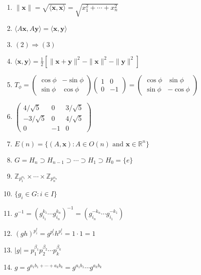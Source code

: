 \documentclass[oneside,10pt,]{article}
\begin{document}
\begin{enumerate}
\item{}\(\displaystyle \| {\mathbf x} \| = \sqrt{\langle {\mathbf x}, {\mathbf x} \rangle} = \sqrt{x_1^2 + \cdots + x_n^2}\)%
\item{}\(\displaystyle \langle A{\mathbf x}, A{\mathbf y} \rangle = \langle {\mathbf x},{\mathbf y} \rangle\)%
\item{}\(\displaystyle (2) \Rightarrow (3)\)%
\item{}\(\displaystyle \langle {\mathbf x}, {\mathbf y} \rangle = \frac{1}{2} \left[ \|{\mathbf x} +{\mathbf y}\|^2 - \|{\mathbf x}\|^2 - \|{\mathbf y}\|^2 \right]\)%
\item{}\(\displaystyle T_{\phi} = \begin{pmatrix} \cos \phi & - \sin \phi \\ \sin \phi & \cos \phi \end{pmatrix} \begin{pmatrix} 1 & 0 \\ 0 & -1 \end{pmatrix} = \begin{pmatrix} \cos \phi & \sin \phi \\ \sin \phi & - \cos \phi \end{pmatrix}\)%
\item{}\(\displaystyle \begin{pmatrix} 4/ \sqrt{5} & 0 & 3 / \sqrt{5} \\ -3 / \sqrt{5} & 0 & 4 / \sqrt{5} \\ 0 & -1 & 0 \end{pmatrix}\)%
\item{}\(\displaystyle E(n) = \{(A, {\mathbf x}) : A \in O(n) \text{ and } {\mathbf x} \in {\mathbb R}^n \}\)%
\item{}\(\displaystyle G = H_n \supset H_{n - 1} \supset \cdots \supset H_1 \supset H_0 = \{ e \}\)%
\item{}\(\displaystyle {\mathbb Z}_{p_1^{\alpha_1}} \times \cdots \times {\mathbb Z}_{p_n^{\alpha_n}}\)%
\item{}\(\displaystyle \{ g_i \in G : i \in I \}\)%
\item{}\(\displaystyle g^{-1} = (g_{i_1}^{k_{1}} \cdots g_{i_n}^{k_n})^{-1} = (g_{i_n}^{-k_n} \cdots g_{i_{1}}^{-k_{1}})\)%
\item{}\(\displaystyle (gh)^{p_i^t} = g^{p_i^t} h^{p_i^t} = 1 \cdot 1 = 1\)%
\item{}\(\displaystyle |g| = p_1^{\beta_1} p_2^{\beta_2} \cdots p_k^{\beta_k}\)%
\item{}\(\displaystyle g = g^{a_1 b_1 + \cdots + a_k b_k} = g^{a_1 b_1} \cdots g^{a_k b_k}\)%

\end{enumerate}
\end{document}
